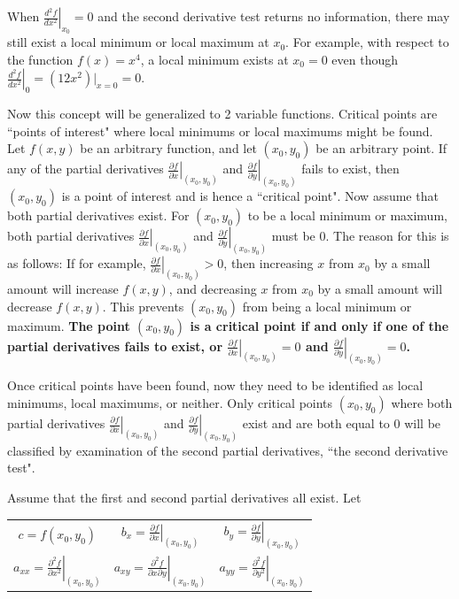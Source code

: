 \documentclass{article}
\begin{document}
When \(\left.\frac{d^2 f}{dx^2}\right|_{x_0} = 0\) and the second derivative test returns no information, there may still exist a local minimum or local maximum at \(x_0\). For example, with respect to the function \(f(x) = x^4\), a local minimum exists at \(x_0 = 0\) even though \(\left.\frac{d^2f}{dx^2}\right|_0 = (12x^2)\Big|_{x = 0} = 0\).

\vspace{5mm}

Now this concept will be generalized to 2 variable functions. Critical points are ``points of interest" where local minimums or local maximums might be found. Let \(f(x, y)\) be an arbitrary function, and let \((x_0, y_0)\) be an arbitrary point. If any of the partial derivatives \(\left.\frac{\partial f}{\partial x}\right|_{(x_0, y_0)}\) and \(\left.\frac{\partial f}{\partial y}\right|_{(x_0, y_0)}\) fails to exist, then \((x_0, y_0)\) is a point of interest and is hence a ``critical point". Now assume that both partial derivatives exist. For \((x_0, y_0)\) to be a local minimum or maximum, both partial derivatives \(\left.\frac{\partial f}{\partial x}\right|_{(x_0, y_0)}\) and \(\left.\frac{\partial f}{\partial y}\right|_{(x_0, y_0)}\) must be \(0\). The reason for this is as follows: If for example, \(\left.\frac{\partial f}{\partial x}\right|_{(x_0, y_0)} > 0\), then increasing \(x\) from \(x_0\) by a small amount will increase \(f(x, y)\), and decreasing \(x\) from \(x_0\) by a small amount will decrease \(f(x, y)\). This prevents \((x_0, y_0)\) from being a local minimum or maximum. {\bf The point \((x_0, y_0)\) is a critical point if and only if one of the partial derivatives fails to exist, or \(\left.\frac{\partial f}{\partial x}\right|_{(x_0, y_0)} = 0\) and \(\left.\frac{\partial f}{\partial y}\right|_{(x_0, y_0)} = 0\).}

Once critical points have been found, now they need to be identified as local minimums, local maximums, or neither. Only critical points \((x_0, y_0)\) where both partial derivatives \(\left.\frac{\partial f}{\partial x}\right|_{(x_0, y_0)}\) and \(\left.\frac{\partial f}{\partial y}\right|_{(x_0, y_0)}\) exist and are both equal to \(0\) will be classified by examination of the second partial derivatives, ``the second derivative test". 

Assume that the first and second partial derivatives all exist. Let 

\begin{tabular}{ccc}
\(c = f(x_0, y_0)\) & \(b_x = \left.\frac{\partial f}{\partial x}\right|_{(x_0, y_0)}\) & \(b_y = \left.\frac{\partial f}{\partial y}\right|_{(x_0, y_0)}\) \\
\(a_{xx} = \left.\frac{\partial^2 f}{\partial x^2}\right|_{(x_0, y_0)}\) & \(a_{xy} = \left.\frac{\partial^2 f}{\partial x \partial y}\right|_{(x_0, y_0)}\) & \(a_{yy} = \left.\frac{\partial^2 f}{\partial y^2}\right|_{(x_0, y_0)}\)  
\end{tabular}
\end{document}
